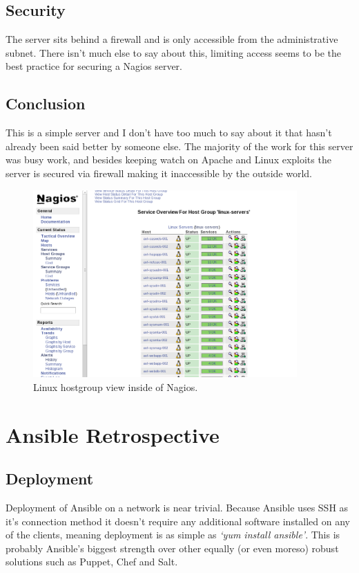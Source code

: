 \documentclass[a4paper]{article}
\begin{document}
\subsection{Security}

The server sits behind a firewall and is only accessible from the administrative subnet. There isn't much else to say about this, limiting access seems to be the best practice for securing a Nagios server.

\subsection{Conclusion}

This is a simple server and I don't have too much to say about it that hasn't already been said better by someone else. The majority of the work for this server was busy work, and besides keeping watch on Apache and Linux exploits the server is secured via firewall making it inaccessible by the outside world.

\begin{figure}[H]
\centering
\includegraphics[width=0.9\textwidth]{nagios-linux.png}
\caption{\label{fig:naglin}Linux hostgroup view inside of Nagios.}
\end{figure}

\section{Ansible Retrospective}

\subsection{Deployment}
Deployment of Ansible on a network is near trivial. Because Ansible uses SSH as it's connection method it doesn't require any additional software installed on any of the clients, meaning deployment is as simple as \textit{`yum install ansible'}. This is probably Ansible's biggest strength over other equally (or even moreso) robust solutions such as Puppet, Chef and Salt. 
\end{document}
